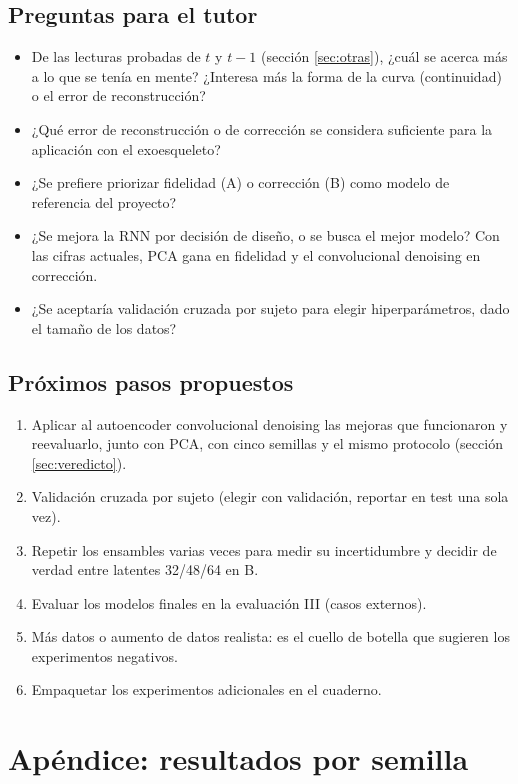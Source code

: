 \documentclass[11pt,a4paper]{article}
\begin{document}
\subsection{Preguntas para el tutor}
\begin{itemize}
\item De las lecturas probadas de $t$ y $t-1$ (sección \ref{sec:otras}), ¿cuál se acerca más a lo que se tenía en mente? ¿Interesa más la forma de la curva (continuidad) o el error de reconstrucción?
\item ¿Qué error de reconstrucción o de corrección se considera suficiente para la aplicación con el exoesqueleto?
\item ¿Se prefiere priorizar fidelidad (A) o corrección (B) como modelo de referencia del proyecto?
\item ¿Se mejora la RNN por decisión de diseño, o se busca el mejor modelo? Con las cifras actuales, PCA gana en fidelidad y el convolucional denoising en corrección.
\item ¿Se aceptaría validación cruzada por sujeto para elegir hiperparámetros, dado el tamaño de los datos?
\end{itemize}

\subsection{Próximos pasos propuestos}
\begin{enumerate}
\item Aplicar al autoencoder convolucional denoising las mejoras que funcionaron y reevaluarlo, junto con PCA, con cinco semillas y el mismo protocolo (sección \ref{sec:veredicto}).
\item Validación cruzada por sujeto (elegir con validación, reportar en test una sola vez).
\item Repetir los ensambles varias veces para medir su incertidumbre y decidir de verdad entre latentes 32/48/64 en B.
\item Evaluar los modelos finales en la evaluación III (casos externos).
\item Más datos o aumento de datos realista: es el cuello de botella que sugieren los experimentos negativos.
\item Empaquetar los experimentos adicionales en el cuaderno.
\end{enumerate}

\appendix
\section{Apéndice: resultados por semilla}
\end{document}
